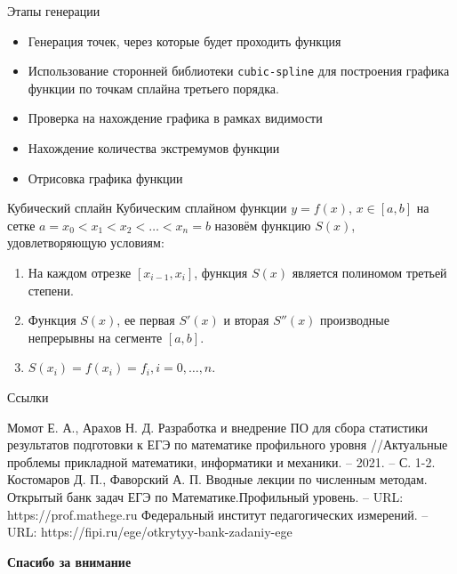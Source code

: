 \documentclass[aspectratio=169]{beamer}
\begin{document}
\begin{frame}{Этапы генерации}
    \begin{itemize}
        \item Генерация точек, через которые будет проходить функция
        \item Использование сторонней библиотеки \texttt{cubic-spline} для построения графика функции по точкам сплайна третьего порядка.
        \item Проверка на нахождение графика в рамках видимости %
        \item Нахождение количества экстремумов функции
        \item Отрисовка графика функции
    \end{itemize}
    
\end{frame}


\begin{frame}{Кубический сплайн}
    Кубическим сплайном функции $y = f(x)$, $x\in[a, b]$ на сетке $a=x_0<x_1<x_2< \dots <x_n=b$ назовём функцию $S(x)$, удовлетворяющую условиям:
    \begin{enumerate}
        \item На каждом отрезке $[x_{i-1},x_i]$, функция $S(x)$ является полиномом третьей степени.
        \item Функция $S(x)$, ее первая $S'(x)$ и вторая $S''(x)$ производные непрерывны на сегменте $[a, b]$.
        \item $S(x_i)=f(x_i)=f_i, i=0,\dots,n$.
\end{enumerate}
\end{frame}   

\begin{frame}{Ссылки}
    \begin{thebibliography}{10}
         Момот Е. А., Арахов Н. Д. Разработка и внедрение ПО для сбора статистики результатов подготовки к ЕГЭ по математике профильного уровня //Актуальные проблемы прикладной математики, информатики и механики. – 2021. – С. 1-2.
        Костомаров Д. П., Фаворский А. П. Вводные лекции по численным методам.
        Открытый банк задач ЕГЭ по Математике.Профильный уровень. – URL:  https://prof.mathege.ru
        Федеральный институт педагогических измерений. – URL:  https://fipi.ru/ege/otkrytyy-bank-zadaniy-ege
        
    \end{thebibliography}
\end{frame}

\begin{frame}
    \center\Large\textcolor{NordBrightBlue}{\textbf{Спасибо за внимание}}\\
\end{frame}
\end{document}
